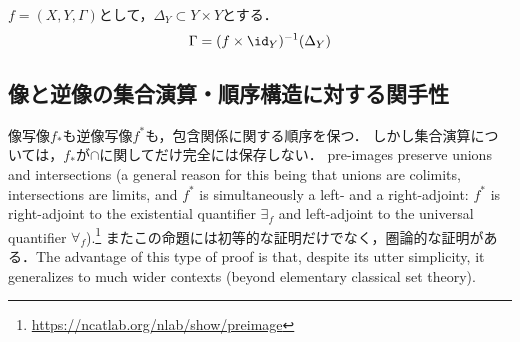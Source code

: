 \documentclass[uplatex,dvipdfmx]{jsreport}
\begin{document}
\begin{example}
    $f=(X,Y,\Gamma)$として，$\Delta_Y\subset Y\times Y$とする．
    \[\Gamma=(f\times\id_Y)^{-1}(\Delta_Y)\]
\end{example}

\subsection{像と逆像の集合演算・順序構造に対する関手性}

\begin{tcolorbox}[colframe=ForestGreen, colback=ForestGreen!10!white, breakable ,colbacktitle=ForestGreen!40!white, coltitle=black,fonttitle=\bfseries\sffamily,
    title=interactions of images and pre-images with unions and intersections]
    像写像$f_*$も逆像写像$f^*$も，包含関係に関する順序を保つ．
    しかし集合演算については，$f_*$が$\cap$に関してだけ完全には保存しない．
    pre-images preserve unions and intersections (a general reason for this being that unions are colimits, intersections are limits, and $f^\ast$ is simultaneously a left- and a right-adjoint: $f^\ast$ is right-adjoint to the existential quantifier $\exists_f$ and left-adjoint to the universal quantifier $\forall_f$).\footnote{\url{https://ncatlab.org/nlab/show/preimage}}
    またこの命題には初等的な証明だけでなく，圏論的な証明がある．The advantage of this type of proof is that, despite its utter simplicity, it generalizes to much wider contexts (beyond elementary classical set theory).
\end{tcolorbox}
\end{document}

